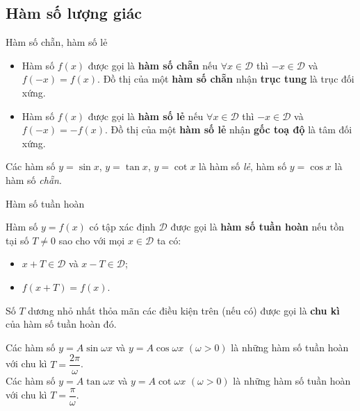 \subsection{Hàm số lượng giác}
\begin{khung4}{Hàm số chẵn, hàm số lẻ}
	\begin{multicols}{2}
		\begin{itemize}
			\item Hàm số $f(x)$ được gọi là \textbf{hàm số chẵn} nếu $\forall x \in \mathscr{D}$ thì $-x \in \mathscr{D}$ và $f(-x)=f(x)$. Đồ thị của một \textbf{hàm số chẵn} nhận \textbf{trục tung} là trục đối xứng.
			\item Hàm số $f(x)$ được gọi là \textbf{hàm số lẻ} nếu $\forall x \in \mathscr{D}$ thì $-x \in \mathscr{D}$ và $f(-x)=-f(x)$. Đồ thị của một \textbf{hàm số lẻ} nhận \textbf{gốc toạ độ} là tâm đối xứng.
		\end{itemize}
	\end{multicols}
	Các hàm số $y=\sin x$, $y=\tan x$, $y=\cot x$ là hàm số \textit{lẻ}, hàm số $y=\cos x$ là hàm số \textit{chẵn}.
\end{khung4}
\begin{khung4}{Hàm số tuần hoàn}
	\begin{dn}
		Hàm số $y=f(x)$ có tập xác định $\mathscr{D}$ được gọi là \textbf{hàm số tuần hoàn} nếu tồn tại số $T \neq 0$ sao cho với mọi $x \in \mathscr{D}$ ta có:
		\begin{itemize}
			\item $x+T \in \mathscr{D}$ và $x-T \in \mathscr{D}$;
			\item $f(x+T)=f(x)$.
		\end{itemize}
		Số $T$ dương nhỏ nhất thỏa mãn các điều kiện trên (nếu có) được gọi là \textbf{chu kì} của hàm số tuần hoàn đó.
	\end{dn}
	Các hàm số $y=A \sin \omega x$ và $y=A \cos \omega x$ $(\omega>0)$ là những hàm số tuần hoàn với chu kì $T=\dfrac{2 \pi}{\omega}$.\\
	Các hàm số $y=A \tan \omega x$ và $y=A \cot \omega x$ $(\omega>0)$ là những hàm số tuần hoàn với chu kì $T=\dfrac{\pi}{\omega}$.
\end{khung4}
